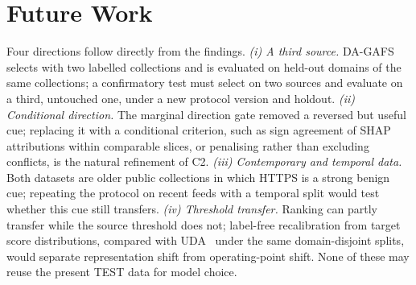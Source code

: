 \section{Future Work}\label{sec:future}
Four directions follow directly from the findings. \emph{(i) A third source.} DA-GAFS selects with two labelled collections and is evaluated on held-out domains of the same collections; a confirmatory test must select on two sources and evaluate on a third, untouched one, under a new protocol version and holdout. \emph{(ii) Conditional direction.} The marginal direction gate removed a reversed but useful cue; replacing it with a conditional criterion, such as sign agreement of SHAP attributions within comparable slices, or penalising rather than excluding conflicts, is the natural refinement of C2. \emph{(iii) Contemporary and temporal data.} Both datasets are older public collections in which HTTPS is a strong benign cue; repeating the protocol on recent feeds with a temporal split would test whether this cue still transfers. \emph{(iv) Threshold transfer.} Ranking can partly transfer while the source threshold does not; label-free recalibration from target score distributions, compared with UDA~\cite{rashid2024} under the same domain-disjoint splits, would separate representation shift from operating-point shift. None of these may reuse the present TEST data for model choice.
